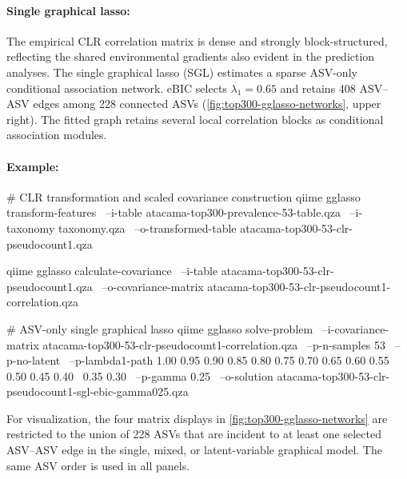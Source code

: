 \documentclass[11pt,a4paper]{article}
\begin{document}
\paragraph{Single graphical lasso:} \mbox{}
The empirical CLR correlation matrix is dense and strongly block-structured,
reflecting the shared environmental gradients also evident in the prediction
analyses. The single graphical lasso (SGL) estimates a sparse ASV-only conditional association network. eBIC selects
$\lambda_1=0.65$ and retains 408 ASV--ASV edges among 228 connected ASVs
(\autoref{fig:top300-gglasso-networks}, upper right). The fitted graph retains
several local correlation blocks as conditional association modules.

\paragraph{Example:} \mbox{}
\begin{PseudoCode}
# CLR transformation and scaled covariance construction
qiime gglasso transform-features \
    --i-table atacama-top300-prevalence-53-table.qza \
    --i-taxonomy taxonomy.qza \
    --o-transformed-table atacama-top300-53-clr-pseudocount1.qza

qiime gglasso calculate-covariance \
    --i-table atacama-top300-53-clr-pseudocount1.qza \
    --o-covariance-matrix atacama-top300-53-clr-pseudocount1-correlation.qza

# ASV-only single graphical lasso
qiime gglasso solve-problem \
    --i-covariance-matrix atacama-top300-53-clr-pseudocount1-correlation.qza \
    --p-n-samples 53 \
    --p-no-latent \
    --p-lambda1-path 1.00 0.95 0.90 0.85 0.80 0.75 0.70 0.65 0.60 0.55 0.50 0.45 0.40 \
        0.35 0.30 \
    --p-gamma 0.25 \
    --o-solution atacama-top300-53-clr-pseudocount1-sgl-ebic-gamma025.qza
\end{PseudoCode}

For visualization, the four matrix displays in
\autoref{fig:top300-gglasso-networks} are restricted to the union of 228 ASVs
that are incident to at least one selected ASV--ASV edge in the single, mixed,
or latent-variable graphical model. The same ASV order is used in all panels.
\end{document}
